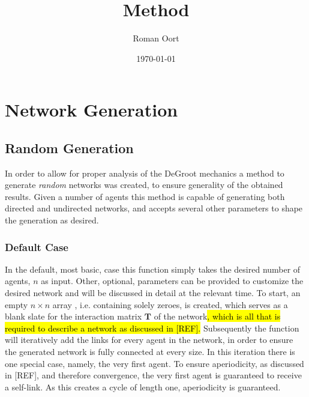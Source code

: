 \documentclass{article}
\title{Method}
\author{Roman Oort}
\date{\today}
\newcommand{\T}{\textbf{T}}
\begin{document}
\maketitle

\tableofcontents
\newpage

\section{Network Generation}

\subsection{Random Generation}
\label{generation:random}
In order to allow for proper analysis of the DeGroot mechanics a method to generate \emph{random} networks was created, to ensure generality of the obtained results. Given a number of agents this method is capable of generating both directed and undirected networks, and accepts several other parameters to shape the generation as desired.

\subsubsection{Default Case}
In the default, most basic, case this function simply takes the desired number of agents, $n$ as input. Other, optional, parameters can be provided to customize the desired network and will be discussed in detail at the relevant time.
To start, an empty $n\times n$ array \cite{2020NumPy-Array}, i.e. containing solely zeroes, is created, which serves as a blank slate for the interaction matrix $\T$ of the network\hl{, which is all that is required to describe a network as discussed in [REF].}
Subsequently the function will iteratively add the links for every agent in the network, in order to ensure the generated network is fully connected at every size. \newline
In this iteration there is one special case, namely, the very first agent. To ensure aperiodicity, as discussed in [REF], and therefore convergence, the very first agent is guaranteed to receive a self-link. As this creates a cycle of length one, aperiodicity is guaranteed. \newline
\end{document}
